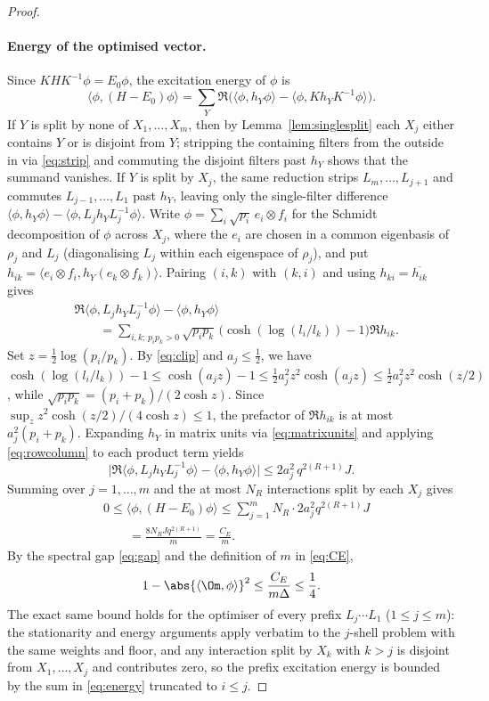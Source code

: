 \begin{proof}
\paragraph{Energy of the optimised vector.}
Since $KHK^{-1}\phi=E_0\phi$, the excitation energy of $\phi$ is
\[
 \langle\phi,(H-E_0)\phi\rangle=\sum_Y\Re\bigl(\langle\phi,h_Y\phi\rangle-\langle\phi,Kh_YK^{-1}\phi\rangle\bigr).
\]
If $Y$ is split by none of $X_1,\dots,X_m$, then by
Lemma~\ref{lem:singlesplit} each $X_j$ either contains $Y$ or is disjoint
from $Y$; stripping the containing filters from the outside in via
\eqref{eq:strip} and commuting the disjoint filters past $h_Y$ shows that
the summand vanishes. If $Y$ is split by $X_j$, the same reduction strips
$L_m,\dots,L_{j+1}$ and commutes $L_{j-1},\dots,L_1$ past $h_Y$, leaving
only the single-filter difference
$\langle\phi,h_Y\phi\rangle-\langle\phi,L_jh_YL_j^{-1}\phi\rangle$. Write
$\phi=\sum_i\sqrt{p_i}\,e_i\otimes f_i$ for the Schmidt decomposition of
$\phi$ across $X_j$, where the $e_i$ are chosen in a common eigenbasis of
$\rho_j$ and $L_j$ (diagonalising $L_j$ within each eigenspace of
$\rho_j$), and put
$h_{ik}=\langle e_i\otimes f_i,h_Y(e_k\otimes f_k)\rangle$. Pairing
$(i,k)$ with $(k,i)$ and using $h_{ki}=\overline{h_{ik}}$ gives
\[
\begin{split}
 &\Re\langle\phi,L_jh_YL_j^{-1}\phi\rangle-\langle\phi,h_Y\phi\rangle\\
 &\qquad=\sum_{i,k:\,p_ip_k>0}\sqrt{p_ip_k}\,\bigl(\cosh(\log(l_i/l_k))-1\bigr)\Re h_{ik}.
\end{split}
\]
Set $z=\frac12\log(p_i/p_k)$. By \eqref{eq:clip} and $a_j\le\frac12$, we
have
$\cosh(\log(l_i/l_k))-1\le\cosh(a_jz)-1\le\frac12a_j^2z^2\cosh(a_jz)\le\frac12a_j^2z^2\cosh(z/2)$,
while $\sqrt{p_ip_k}=(p_i+p_k)/(2\cosh z)$. Since
$\sup_z z^2\cosh(z/2)/(4\cosh z)\le1$, the prefactor of $\Re h_{ik}$ is at
most $a_j^2(p_i+p_k)$. Expanding $h_Y$ in matrix units via
\eqref{eq:matrixunits} and applying \eqref{eq:rowcolumn} to each product
term yields
\[
 \bigl|\Re\langle\phi,L_jh_YL_j^{-1}\phi\rangle-\langle\phi,h_Y\phi\rangle\bigr|
 \le 2a_j^2\,q^{2(R+1)}J .
\]
Summing over $j=1,\dots,m$ and the at most $N_R$ interactions split by
each $X_j$ gives
\begin{equation}\label{eq:energy}
\begin{split}
 &0\le\langle\phi,(H-E_0)\phi\rangle\le\sum_{j=1}^m N_R\cdot 2a_j^2q^{2(R+1)}J\\
 &\qquad=\frac{8N_RJq^{2(R+1)}}{m}=\frac{C_E}{m}.
\end{split}
\end{equation}
By the spectral gap \eqref{eq:gap} and the definition of $m$ in \eqref{eq:CE},
\begin{equation}\label{eq:overlap}
 1-\abs{\langle\Om,\phi\rangle}^2\le\frac{C_E}{m\Delta}\le\frac14 .
\end{equation}
The exact same bound holds for the optimiser of every prefix
$L_j\cdots L_1$ ($1\le j\le m$): the stationarity and energy arguments
apply verbatim to the $j$-shell problem with the same weights and floor,
and any interaction split by $X_k$ with $k>j$ is disjoint from
$X_1,\dots,X_j$ and contributes zero, so the prefix excitation energy is
bounded by the sum in \eqref{eq:energy} truncated to $i\le j$.


\end{proof}
